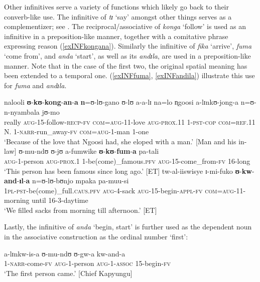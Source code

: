 Other infinitives serve a variety of functions which likely go back to their converb-like use. The infinitive of \textit{tɪ} \lq say' amongst other things serves as a complementizer; see . The reciprocal/associative of \textit{konga} `follow' is used as an infinitive in a preposition-like manner, together with a comitative phrase expressing reason (\ref{exINFkongana}). Similarly the infinitive of \textit{fika} \lq arrive', \textit{fuma} \lq come from', and \textit{anda} \lq start', as well as its  \textit{andɪla}, are used in a preposition-like manner. Note that in the case of the first two, the original spatial meaning has been extended to a temporal one. (\ref{exINFfuma}, \ref{exINFandila}) illustrate this use for \textit{fuma} and \textit{andɪla}.
\begin{exe}
\ex \label{exINFkongana}\gll nalooli \textbf{ʊ}-\textbf{kʊ}-\textbf{kong}-\textbf{an}-\textbf{a} \textbf{n}=ʊ-lʊ-gano ʊ-lʊ a-a-lɪ na=lo n̩goosi a-lɪnkʊ-jong-a n=ʊ-n-nyambala jʊ-mo\\
really \textsc{aug}-15-follow-\textsc{recp}-\textsc{fv} \textsc{com}=\textsc{aug}-11-love \textsc{aug}-\textsc{prox.11} 1-\textsc{pst}-\textsc{cop} \textsc{com}=\textsc{ref.11} N. 1-\textsc{narr}-run\_away-\textsc{fv} \textsc{com}=\textsc{aug}-1-man 1-one\\
\glt `Because of the love that Ngoosi had, she eloped with a man.' [Man and his in-law]
\ex \label{exINFfuma}
\gll ʊ-mu-ndʊ ʊ-jʊ a-fumwike \textbf{ʊ}-\textbf{kʊ}-\textbf{fum}-\textbf{a} pa-tali\\
\textsc{aug}-1-person \textsc{aug}-\textsc{prox.1} 1-be(come)\_famous.\textsc{pfv} \textsc{aug}-15-come\_from-\textsc{fv} 16-long\\
\glt \lq This person has been famous since long ago.' [ET]
\ex \label{exINFandila}
\gll tw-al-iiswisye ɪ-mi-fuko \textbf{ʊ}-\textbf{kw}-\textbf{and}-\textbf{ɪl}-\textbf{a} n=ʊ-lʊ-bʊnjo mpaka pa-muu-si\\
\textsc{1pl}-\textsc{pst}-be(come)\_full.\textsc{caus.pfv} \textsc{aug}-4-sack \textsc{aug}-15-begin-\textsc{appl}-\textsc{fv} \textsc{com}=\textsc{aug}-11-morning until 16-3-daytime\\
\glt \lq We filled sacks from morning till afternoon.' [ET]
\end{exe}%

Lastly, the infinitive of \textit{anda} `begin, start' is further used as the dependent noun in the associative construction as the ordinal number `first':

\begin{exe}
\ex \gll a-lɪnkw-is-a ʊ-mu-ndʊ ʊ-gw-a kw-and-a\\
1-\textsc{narr}-come-\textsc{fv} \textsc{aug}-1-person \textsc{aug}-1-\textsc{assoc} 15-begin-\textsc{fv}\\
\glt `The first person came.' [Chief Kapyungu]
\end{exe}
